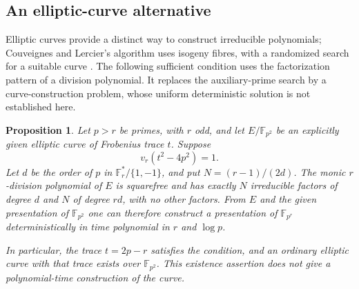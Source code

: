 \documentclass[11pt]{article}
\newtheorem{proposition}[theorem]{Proposition}
\theoremstyle{definition}
\theoremstyle{remark}
\begin{document}
\subsection{An elliptic-curve alternative}

Elliptic curves provide a distinct way to construct irreducible
polynomials; Couveignes and Lercier's algorithm uses isogeny fibres,
with a randomized search for a suitable curve
\cite[\S4]{CouveignesLercier2013}.
The following sufficient condition uses the factorization pattern
of a division polynomial.  It replaces the auxiliary-prime search
by a curve-construction problem, whose uniform deterministic solution
is not established here.

\begin{proposition}\label{prop:elliptic-trace-gate}
Let $p>r$ be primes, with $r$ odd, and let
$E/\mathbb F_{p^2}$ be an explicitly given elliptic curve of
Frobenius trace $t$.  Suppose
\[
 v_r(t^2-4p^2)=1.
\]
Let $d$ be the order of $p$ in
$\mathbb F_r^*/\{1,-1\}$, and put $N=(r-1)/(2d)$.
The monic $r$-division polynomial of $E$ is squarefree and has
exactly $N$ irreducible factors of degree $d$ and $N$ of degree $rd$,
with no other factors.
From $E$ and the given presentation of $\mathbb F_{p^2}$ one can
therefore construct a presentation of $\mathbb F_{p^r}$
deterministically in time polynomial in $r$ and $\log p$.

In particular, the trace $t=2p-r$ satisfies the condition, and an
ordinary elliptic curve with that trace exists over $\mathbb F_{p^2}$.
This existence assertion does not give a polynomial-time
construction of the curve.
\end{proposition}
\end{document}
